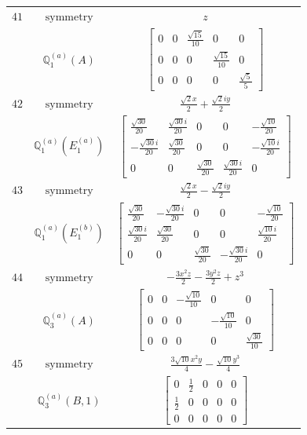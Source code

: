 \documentclass[fleqn,8pt,landscape]{jsarticle}
\begin{document}
\begin{longtable}{ccc}
$ 41 $ & $ \text{symmetry} $ & $ z $ \\
$  $ & $ \mathbb{Q}_{1}^{(a)}(A) $ & $ \begin{bmatrix} 0 & 0 & \frac{\sqrt{15}}{10} & 0 & 0 \\ 0 & 0 & 0 & \frac{\sqrt{15}}{10} & 0 \\ 0 & 0 & 0 & 0 & \frac{\sqrt{5}}{5} \end{bmatrix} $ \\ \hline
$ 42 $ & $ \text{symmetry} $ & $ \frac{\sqrt{2} x}{2} + \frac{\sqrt{2} i y}{2} $ \\
$  $ & $ \mathbb{Q}_{1}^{(a)}(E_{1}^{(a)}) $ & $ \begin{bmatrix} \frac{\sqrt{30}}{20} & \frac{\sqrt{30} i}{20} & 0 & 0 & - \frac{\sqrt{10}}{20} \\ - \frac{\sqrt{30} i}{20} & \frac{\sqrt{30}}{20} & 0 & 0 & - \frac{\sqrt{10} i}{20} \\ 0 & 0 & \frac{\sqrt{30}}{20} & \frac{\sqrt{30} i}{20} & 0 \end{bmatrix} $ \\ \hline
$ 43 $ & $ \text{symmetry} $ & $ \frac{\sqrt{2} x}{2} - \frac{\sqrt{2} i y}{2} $ \\
$  $ & $ \mathbb{Q}_{1}^{(a)}(E_{1}^{(b)}) $ & $ \begin{bmatrix} \frac{\sqrt{30}}{20} & - \frac{\sqrt{30} i}{20} & 0 & 0 & - \frac{\sqrt{10}}{20} \\ \frac{\sqrt{30} i}{20} & \frac{\sqrt{30}}{20} & 0 & 0 & \frac{\sqrt{10} i}{20} \\ 0 & 0 & \frac{\sqrt{30}}{20} & - \frac{\sqrt{30} i}{20} & 0 \end{bmatrix} $ \\ \hline
$ 44 $ & $ \text{symmetry} $ & $ - \frac{3 x^{2} z}{2} - \frac{3 y^{2} z}{2} + z^{3} $ \\
$  $ & $ \mathbb{Q}_{3}^{(a)}(A) $ & $ \begin{bmatrix} 0 & 0 & - \frac{\sqrt{10}}{10} & 0 & 0 \\ 0 & 0 & 0 & - \frac{\sqrt{10}}{10} & 0 \\ 0 & 0 & 0 & 0 & \frac{\sqrt{30}}{10} \end{bmatrix} $ \\ \hline
$ 45 $ & $ \text{symmetry} $ & $ \frac{3 \sqrt{10} x^{2} y}{4} - \frac{\sqrt{10} y^{3}}{4} $ \\
$  $ & $ \mathbb{Q}_{3}^{(a)}(B,1) $ & $ \begin{bmatrix} 0 & \frac{1}{2} & 0 & 0 & 0 \\ \frac{1}{2} & 0 & 0 & 0 & 0 \\ 0 & 0 & 0 & 0 & 0 \end{bmatrix} $ \\ \hline

\end{longtable}
\end{document}
